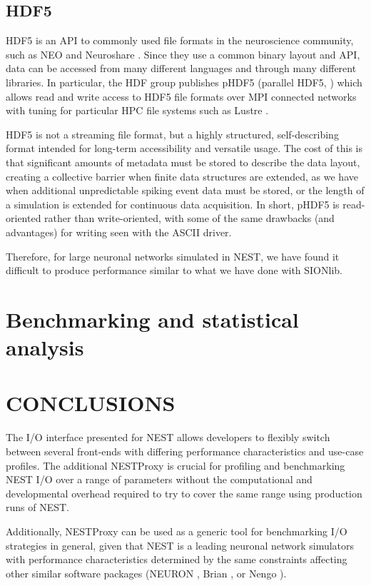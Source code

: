 \documentclass[]{YIC2015}
\begin{document}
\subsection{HDF5}

HDF5 is an API to commonly used file formats in the neuroscience
community, such as NEO \cite{neo} and Neuroshare \cite{neuroshare}.
Since they use a common binary layout and API, data can be accessed
from many different languages and through many different libraries. In
particular, the HDF group publishes pHDF5 (parallel HDF5, \cite{hdf5})
which allows read and write access to HDF5 file formats over MPI
connected networks with tuning for particular HPC file systems such as
Lustre \cite{lustre}.

HDF5 is not a streaming file format, but a highly structured,
self-describing format intended for long-term accessibility and
versatile usage. The cost of this is that significant amounts of
metadata must be stored to describe the data layout, creating a
collective barrier when finite data structures are extended, as we
have when additional unpredictable spiking event data must be stored,
or the length of a simulation is extended for continuous data
acquisition. In short, pHDF5 is read-oriented rather than
write-oriented, with some of the same drawbacks (and advantages) for
writing seen with the ASCII driver.

Therefore, for large neuronal networks simulated in NEST, we have
found it difficult to produce performance similar to what we have done
with SIONlib.

\section{Benchmarking and statistical analysis}


\section{CONCLUSIONS}

The I/O interface presented for NEST allows developers to flexibly
switch between several front-ends with differing performance
characteristics and use-case profiles. The additional NESTProxy is
crucial for profiling and benchmarking NEST I/O over a range of
parameters without the computational and developmental overhead
required to try to cover the same range using production runs of
NEST.

Additionally, NESTProxy can be used as a generic tool for benchmarking
I/O strategies in general, given that NEST is a leading neuronal
network simulators with performance characteristics determined by the
same constraints affecting other similar software packages (NEURON
\cite{neuron}, Brian \cite{brian}, or Nengo \cite{nengo}).
\end{document}
